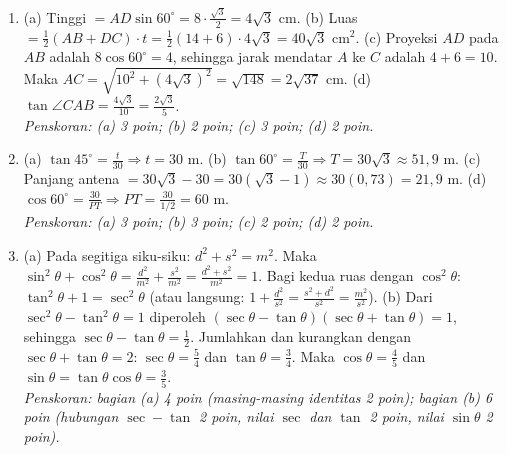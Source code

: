 \documentclass[a4paper,11pt]{article}
\newcommand{\dis}{\displaystyle}
\newcounter{no}
\begin{document}
\par{}\par\vspace{0.2em}
\small\begin{enumerate}[leftmargin=2em,itemsep=3pt,topsep=2pt]
\item[\textbf{1.}] (a) Tinggi $=AD\sin60^\circ=8\cdot\dis\frac{\sqrt3}{2}=4\sqrt3$ cm. (b) Luas $=\dis\frac12(AB+DC)\cdot t=\dis\frac12(14+6)\cdot4\sqrt3=40\sqrt3$ cm$^{2}$. (c) Proyeksi $AD$ pada $AB$ adalah $8\cos60^\circ=4$, sehingga jarak mendatar $A$ ke $C$ adalah $4+6=10$. Maka $AC=\sqrt{10^{2}+(4\sqrt3)^{2}}=\sqrt{148}=2\sqrt{37}$ cm. (d) $\tan\angle CAB=\dis\frac{4\sqrt3}{10}=\dis\frac{2\sqrt3}{5}$. \\ \textit{Penskoran: (a) 3 poin; (b) 2 poin; (c) 3 poin; (d) 2 poin.}
\item[\textbf{2.}] (a) $\tan45^\circ=\dis\frac{t}{30}\Rightarrow t=30$ m. (b) $\tan60^\circ=\dis\frac{T}{30}\Rightarrow T=30\sqrt3\approx51{,}9$ m. (c) Panjang antena $=30\sqrt3-30=30\left(\sqrt3-1\right)\approx30(0{,}73)=21{,}9$ m. (d) $\cos60^\circ=\dis\frac{30}{PT}\Rightarrow PT=\dis\frac{30}{1/2}=60$ m. \\ \textit{Penskoran: (a) 3 poin; (b) 3 poin; (c) 2 poin; (d) 2 poin.}
\item[\textbf{3.}] (a) Pada segitiga siku-siku: $d^{2}+s^{2}=m^{2}$. Maka $\sin^{2}\theta+\cos^{2}\theta=\dis\frac{d^{2}}{m^{2}}+\dis\frac{s^{2}}{m^{2}}=\dis\frac{d^{2}+s^{2}}{m^{2}}=1$. Bagi kedua ruas dengan $\cos^{2}\theta$: $\tan^{2}\theta+1=\sec^{2}\theta$ (atau langsung: $1+\dis\frac{d^{2}}{s^{2}}=\dis\frac{s^{2}+d^{2}}{s^{2}}=\dis\frac{m^{2}}{s^{2}}$). (b) Dari $\sec^{2}\theta-\tan^{2}\theta=1$ diperoleh $(\sec\theta-\tan\theta)(\sec\theta+\tan\theta)=1$, sehingga $\sec\theta-\tan\theta=\dis\frac12$. Jumlahkan dan kurangkan dengan $\sec\theta+\tan\theta=2$: $\sec\theta=\dis\frac54$ dan $\tan\theta=\dis\frac34$. Maka $\cos\theta=\dis\frac45$ dan $\sin\theta=\tan\theta\cos\theta=\dis\frac35$. \\ \textit{Penskoran: bagian (a) 4 poin (masing-masing identitas 2 poin); bagian (b) 6 poin (hubungan $\sec-\tan$ 2 poin, nilai $\sec$ dan $\tan$ 2 poin, nilai $\sin\theta$ 2 poin).}
\end{enumerate}
\end{document}
